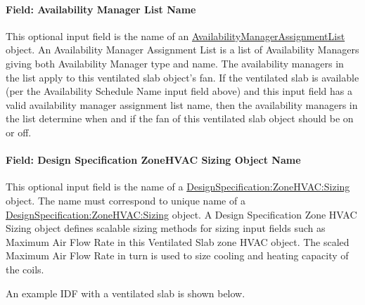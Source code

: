 \paragraph{Field: Availability Manager List Name}\label{field-availability-manager-list-name-001}

This optional input field is the name of an \hyperref[availabilitymanagerassignmentlist]{AvailabilityManagerAssignmentList} object. An Availability Manager Assignment List is a list of Availability Managers giving both Availability Manager type and name. The availability managers in the list apply to this ventilated slab object's fan. If the ventilated slab is available (per the Availability Schedule Name input field above) and this input field has a valid availability manager assignment list name, then the availability managers in the list determine when and if the fan of this ventilated slab object should be on or off.

\paragraph{Field: Design Specification ZoneHVAC Sizing Object Name}\label{field-design-specification-zonehvac-sizing-object-name}

This optional input field is the name of a \hyperref[designspecificationzonehvacsizing]{DesignSpecification:ZoneHVAC:Sizing} object. The name must correspond to unique name of a \hyperref[designspecificationzonehvacsizing]{DesignSpecification:ZoneHVAC:Sizing} object. A Design Specification Zone HVAC Sizing object defines scalable sizing methods for sizing input fields such as Maximum Air Flow Rate in this Ventilated Slab zone HVAC object. The scaled Maximum Air Flow Rate in turn is used to size cooling and heating capacity of the coils.

An example IDF with a ventilated slab is shown below.

